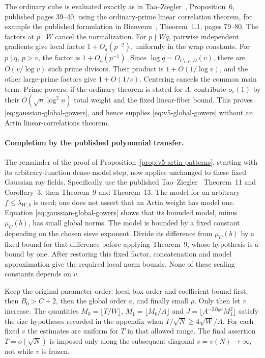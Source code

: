 The ordinary cube is evaluated exactly as in Tao--Ziegler~\cite{v5tz},
Proposition~6, published pages 39--40, using the ordinary-prime linear
correlation theorem, for example the published formulation in
Bienvenu~\cite{v6bienvenu}, Theorem~1.1, pages 79--80.
The factors at $p\mid W$ cancel the normalization.
For $p\nmid Wq$, pairwise independent gradients give local factor
$1+O_a(p^{-2})$, uniformly in the wrap constants. For $p\mid q$,
$p>v$, the factor is $1+O_a(p^{-1})$. Since
$\log q=O_{C_1,\rho,D}(v)$, there are $O(v/\log v)$ such prime divisors.
Their product is $1+O(1/\log v)$, and the other large-prime factors
give $1+O(1/v)$. Centering cancels the common main term. Prime powers,
if the ordinary theorem is stated for $\Lambda$, contribute $o_v(1)$
by their $O(\sqrt n\log^2 n)$ total weight and the fixed linear-fiber
bound. This proves \eqref{eq:gaussian-global-gowers}, and hence supplies
\eqref{eq:v5-global-gowers} without an Artin linear-correlations theorem.

\paragraph{Completion by the published polynomial transfer.}
The remainder of the proof of Proposition~\ref{prop:v5-artin-patterns},
starting with its arbitrary-function dense-model step, now applies
unchanged to these fixed Gaussian ray fields. Specifically use the
published Tao--Ziegler~\cite{v5tz} Theorem~11 and Corollary~3, then Theorem~9 and
Theorem~13. The model for an arbitrary $f\leq\lambda_{W,b}$ is used;
one does not assert that an Artin weight has model one. Equation
\eqref{eq:gaussian-global-gowers} shows that its bounded model, minus
$\mu_C(b)$, has small global norms. The model is bounded by a fixed
constant depending on the chosen sieve exponent. Divide its difference
from $\mu_C(b)$ by a fixed bound for that difference before applying
Theorem~9, whose hypothesis is a bound by one. After restoring this
fixed factor, concatenation and model approximation give the required
local norm bounds. None of these scaling constants depends on $v$.

Keep the original parameter order: local box order and coefficient
bound first, then $B_0>C+2$, then the global order $a$, and finally
small $\rho$. Only then let $v$ increase. The quantities
$M_0=\lfloor T/W\rfloor$, $M_1=\lfloor M_0/A\rfloor$ and
$J=\lfloor A^{-2B_0a}M_1^2\rfloor$ satisfy the size hypotheses recorded
in the appendix when $T/\sqrt N\geq4\sqrt W/A$.
For each fixed $v$ the estimates are uniform for $T$ in that allowed
range. The final assertion $T=o(\sqrt N)$ is imposed only along the
subsequent diagonal $v=v(N)\to\infty$, not while $v$ is frozen.

